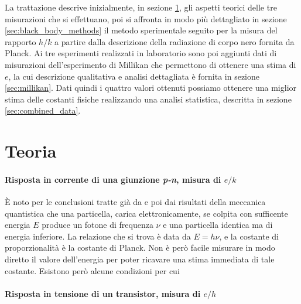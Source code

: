 \documentclass[a4paper, varvw, nofootinbib]{revtex4-2}
\begin{document}
La trattazione descrive inizialmente, in sezione \ref{sec:theory}, gli aspetti teorici delle tre misurazioni che si effettuano, poi si affronta in modo più dettagliato in sezione \ref{sec:black_body_methods} il metodo sperimentale seguito per la misura del rapporto $h/k$ a partire dalla descrizione della radiazione di corpo nero fornita da Planck. Ai tre esperimenti realizzati in laboratorio sono poi aggiunti dati di misurazioni dell'esperimento di Millikan che permettono di ottenere una stima di $e$, la cui descrizione qualitativa e analisi dettagliata è fornita in sezione \ref{sec:millikan}. Dati quindi i quattro valori ottenuti possiamo ottenere una miglior stima delle costanti fisiche realizzando una analisi statistica, descritta in sezione \ref{sec:combined_data}. 

\section{Teoria}\label{sec:theory}

\paragraph*{Risposta in corrente di una giunzione \emph{p-n}, misura di $e/k$}

È noto per le conclusioni tratte già da \cite{einsteinConcerningHeuristicPoint1965} e poi dai risultati della meccanica quantistica che una particella, carica elettronicamente, se colpita con sufficente energia $E$ produce un fotone di frequenza $\nu$ e una particella identica ma di energia inferiore. La relazione che si trova è data da $E=h\nu$, e la costante di proporzionalità è la costante di Planck. Non è però facile misurare in modo diretto il valore dell'energia per poter ricavare una stima immediata di tale costante. Esistono però alcune condizioni per cui 

\paragraph*{Risposta in tensione di un transistor, misura di $e/h$}
\end{document}
